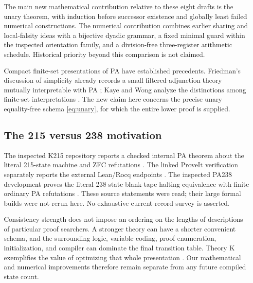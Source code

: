 The main new mathematical contribution relative to these eight drafts is the unary theorem, with induction before successor existence and globally least failed numerical constructions. The numerical contribution combines earlier sharing and local-falsity ideas with a bijective dyadic grammar, a fixed minimal guard within the inspected orientation family, and a division-free three-register arithmetic schedule. Historical priority beyond this comparison is not claimed.

Compact finite-set presentations of PA have established precedents. Friedman's discussion of simplicity already records a small filtered-adjunction theory mutually interpretable with PA \cite[Section C2]{friedman}; Kaye and Wong analyze the distinctions among finite-set interpretations \cite{kaye-wong}. The new claim here concerns the precise unary equality-free schema \eqref{eq:unary}, for which the entire lower proof is supplied.

\subsection{The 215 versus 238 motivation}

The inspected K215 repository reports a checked internal PA theorem about the literal 215-state machine and ZFC refutations \cite{k215pa}. The linked ProveIt verification separately reports the external Lean/Rocq endpoints \cite{proveit}. The inspected PA238 development proves the literal 238-state blank-tape halting equivalence with finite ordinary PA refutations \cite{pa238}. These source statements were read; their large formal builds were not rerun here. No exhaustive current-record survey is asserted.

Consistency strength does not impose an ordering on the lengths of descriptions of particular proof searchers. A stronger theory can have a shorter convenient schema, and the surrounding logic, variable coding, proof enumeration, initialization, and compiler can dominate the final transition table. Theory K exemplifies the value of optimizing that whole presentation \cite{k230}. Our mathematical and numerical improvements therefore remain separate from any future compiled state count.
